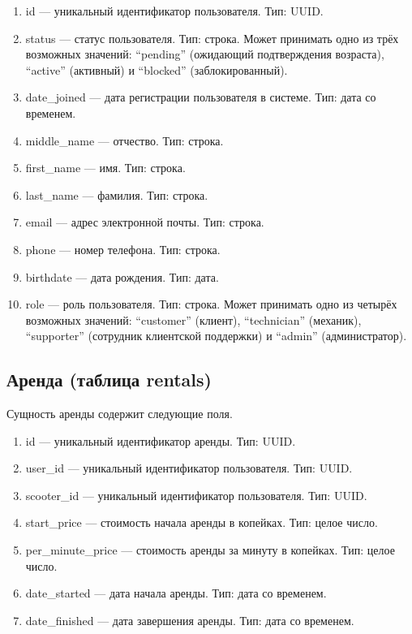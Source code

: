 \begin{enumerate}
	\item id --- уникальный идентификатор пользователя. Тип: UUID.
	\item status --- статус пользователя. Тип: строка. Может принимать одно из трёх возможных значений: \enquote{pending} (ожидающий подтверждения возраста), \enquote{active} (активный) и \enquote{blocked} (заблокированный).
	\item date\_joined --- дата регистрации пользователя в системе. Тип: дата со временем.
	\item middle\_name --- отчество. Тип: строка.
	\item first\_name --- имя. Тип: строка.
	\item last\_name --- фамилия. Тип: строка.
	\item email --- адрес электронной почты. Тип: строка.
	\item phone --- номер телефона. Тип: строка.
	\item birthdate --- дата рождения. Тип: дата.
	\item role --- роль пользователя. Тип: строка. Может принимать одно из четырёх возможных значений: \enquote{customer} (клиент), \enquote{technician} (механик), \enquote{supporter} (сотрудник клиентской поддержки) и \enquote{admin} (администратор).
\end{enumerate}

\subsection{Аренда (таблица rentals)}

Сущность аренды содержит следующие поля.

\begin{enumerate}
	\item id --- уникальный идентификатор аренды. Тип: UUID.
	\item user\_id --- уникальный идентификатор пользователя. Тип: UUID.
	\item scooter\_id --- уникальный идентификатор пользователя. Тип: UUID.
	\item start\_price --- стоимость начала аренды в копейках. Тип: целое число.
	\item per\_minute\_price --- стоимость аренды за минуту в копейках. Тип: целое число.
	\item date\_started --- дата начала аренды. Тип: дата со временем.
	\item date\_finished --- дата завершения аренды. Тип: дата со временем.
\end{enumerate}

